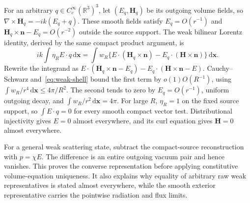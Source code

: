 \documentclass[11pt]{article}
\newcommand{\dd}{\,\mathrm{d}}
\begin{document}
For an arbitrary $q\in C_c^\infty(\mathbb R^3)^3$, let $(E_q,\mathbf H_q)$ be its outgoing volume fields, so $\nabla\times\mathbf H_q=-ik(E_q+q)$. These smooth fields satisfy $E_q=O(r^{-1})$ and $\mathbf H_q\times\mathbf n-E_q=O(r^{-2})$ outside the source support. The weak bilinear Lorentz identity, derived by the same compact product argument, is
\begin{equation}\label{eq:weak-lorentz}
 ik\int\eta_R E\cdot q\dd\mathbf x
 =\int w_R\{E\cdot(\mathbf H_q\times\mathbf n)
                  -E_q\cdot(\mathbf H\times\mathbf n)\}\dd\mathbf x.
\end{equation}
Rewrite the integrand as $E\cdot(\mathbf H_q\times\mathbf n-E_q)-E_q\cdot(\mathbf H\times\mathbf n-E)$. Cauchy--Schwarz and~\eqref{eq:weak-shell} bound the first term by $o(1)O(R^{-1})$, using $\int w_R/r^4\dd\mathbf x\leq4\pi/R^2$. The second tends to zero by $E_q=O(r^{-1})$, uniform outgoing decay, and $\int w_R/r^2\dd\mathbf x=4\pi$. For large $R$, $\eta_R=1$ on the fixed source support, so $\int E\cdot q=0$ for every smooth compact vector test. Distributional injectivity gives $E=0$ almost everywhere, and its curl equation gives $\mathbf H=0$ almost everywhere.

For a general weak scattering state, subtract the compact-source reconstruction with $p=\chi E$. The difference is an entire outgoing vacuum pair and hence vanishes. This proves the converse representation before applying constitutive volume-equation uniqueness. It also explains why equality of arbitrary raw weak representatives is stated almost everywhere, while the smooth exterior representative carries the pointwise radiation and flux limits.
\end{document}
